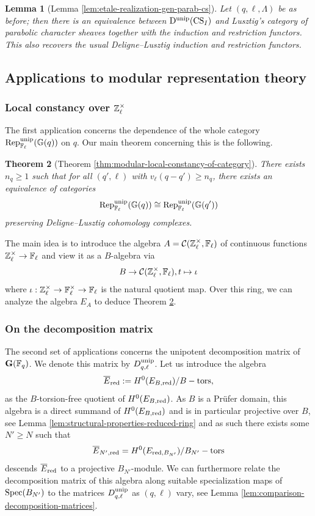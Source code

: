 \documentclass[a4paper, 10pt, oneside, reqno]{amsart}
\theoremstyle{plain}
\newtheorem{thm}{Theorem}[subsection]
\newtheorem{lem}[thm]{Lemma}
\theoremstyle{definition}
\theoremstyle{remark}
\newcommand{\Gbb}{\mathbb{G}}
\begin{document}
\begin{lem}[Lemma \ref{lem:etale-realization-gen-parab-cs}]
Let $(q, \ell, \Lambda)$ be as before; then there is an equivalence between $\mathrm{D}^{\mathrm{unip}}(\mathrm{CS}_I)$ and Lusztig's category of parabolic character sheaves \cite{LusztigParabCS} together with the induction and restriction functors. This also recovers the usual Deligne--Lusztig induction and restriction functors.
\end{lem}

\subsection{Applications to modular representation theory}

\subsubsection{Local constancy over $\mathbb{Z}_{\ell}^{\times}$}

The first application concerns the dependence of the whole category $\Rep_{\Fl}^{\unip}(\Gbb(q))$ on $q$. Our main theorem concerning this is the following. 

\begin{thm}[Theorem \ref{thm:modular-local-constancy-of-category}]\label{thm:local-constancy-intro}
There exists $n_q \geq 1$ such that for all $(q',\ell)$ with $v_{\ell}(q-q') \geq n_q$, there exists an equivalence of categories 
$$\Rep_{\Fl}^{\unip}(\Gbb(q)) \cong \Rep_{\Fl}^{\unip}(\Gbb(q'))$$
preserving Deligne--Lusztig cohomology complexes.
\end{thm}

The main idea is to introduce the algebra $A = \mathcal{C}(\mathbb{Z}_{\ell}^{\times}, \mathbb{F}_{\ell})$ of continuous functions $\mathbb{Z}_{\ell}^{\times} \to \mathbb{F}_{\ell}$ and view it as a $B$-algebra via 
$$B \to \mathcal{C}(\mathbb{Z}_{\ell}^{\times}, \mathbb{F}_{\ell}), t \mapsto \iota$$
where $\iota : \mathbb{Z}_{\ell}^{\times} \to \mathbb{F}_{\ell}^{\times} \to \mathbb{F}_{\ell}$ is the natural quotient map. Over this ring, we can analyze the algebra $E_A$ to deduce Theorem \ref{thm:local-constancy-intro}.

\subsubsection{On the decomposition matrix}

The second set of applications concerns the unipotent decomposition matrix of $\mathbf{G}(\mathbb{F}_q)$. We denote this matrix by $D_{q,\ell}^{\mathrm{unip}}$. Let us introduce the algebra 
$$\overline{E}_{\mathrm{red}} := H^0(E_{B,\mathrm{red}})/B-\mathrm{tors},$$
as the $B$-torsion-free quotient of $H^0(E_{B,\mathrm{red}})$. As $B$ is a Prüfer domain, this algebra is a direct summand of $H^0(E_{B,\mathrm{red}})$ and is in particular projective over $B$, see Lemma \ref{lem:structural-properties-reduced-ring} and as such there exists some $N' \geq N$ such that
$$\overline{E}_{N', \mathrm{red}} = H^0(E_{\mathrm{red}, B_{N'}})/B_{N'}-\mathrm{tors}$$
descends $\overline{E}_{\mathrm{red}}$ to a projective $B_{N'}$-module. We can furthermore relate the decomposition matrix of this algebra along suitable specialization maps of $\mathrm{Spec}(B_{N'})$ to the matrices $D_{q,\ell}^{\mathrm{unip}}$ as $(q,\ell)$ vary, see Lemma \ref{lem:comparison-decomposition-matrices}. 
\end{document}

